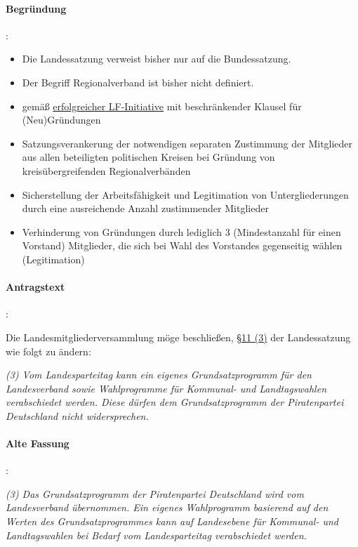 \paragraph{Begründung}:

\begin{itemize}
\item Die Landessatzung verweist bisher nur auf die Bundessatzung.
\item Der Begriff Regionalverband ist bisher nicht definiert.
\item gemäß \href{http://lqfb.piraten-lsa.de/lsa/initiative/show/33.html}{erfolgreicher LF-Initiative} mit beschränkender Klausel für (Neu)Gründungen
\item Satzungsverankerung der notwendigen separaten Zustimmung der Mitglieder aus allen beteiligten politischen Kreisen bei Gründung von kreisübergreifenden Regionalverbänden
\item Sicherstellung der Arbeitsfähigkeit und Legitimation von Untergliederungen durch eine ausreichende Anzahl zustimmender Mitglieder
\item Verhinderung von Gründungen durch lediglich 3 (Mindestanzahl für einen Vorstand) Mitglieder, die sich bei Wahl des Vorstandes gegenseitig wählen (Legitimation) 
\end{itemize}



\paragraph{Antragstext}:

Die Landesmitgliederversammlung möge beschließen, \href{http://wiki.piratenpartei.de/LSA:Satzung#.C2.A7_11_-_Satzungs-_und_Programm.C3.A4nderung}{§11 (3)} der Landessatzung wie folgt zu ändern:

\textit{(3) Vom Landesparteitag kann ein eigenes Grundsatzprogramm für den Landesverband sowie Wahlprogramme für Kommunal- und Landtagswahlen verabschiedet werden. Diese dürfen dem Grundsatzprogramm der Piratenpartei Deutschland nicht widersprechen.}

\paragraph{Alte Fassung}:

\textit{(3) Das Grundsatzprogramm der Piratenpartei Deutschland wird vom Landesverband übernommen. Ein eigenes Wahlprogramm basierend auf den Werten des Grundsatzprogrammes kann auf Landesebene für Kommunal- und Landtagswahlen bei Bedarf vom Landesparteitag verabschiedet werden. }

